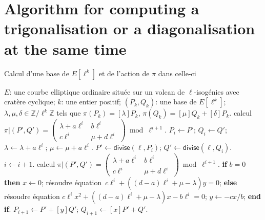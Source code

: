 \documentclass[10pt,a4paper]{book}
\theoremstyle{plain}
\theoremstyle{definition}
\theoremstyle{definition}
\theoremstyle{definition}
\theoremstyle{definition}
\theoremstyle{remark}
\theoremstyle{remark}
\theoremstyle{definition}
\begin{document}
\section{Algorithm for computing a trigonalisation or a diagonalisation at the same time}
\begin{algorithm}
\caption{\label{alg:app:bas:fro}Calcul d'une base de $E[\ell^k]$ et de l'action de $\pi$ dans celle-ci}
\begin{algorithmic}[1]
\REQUIRE $E$: une courbe elliptique ordinaire située sur un volcan de $\ell$-isogénies avec cratère cyclique;
$k$: une entier positif;
\ENSURE $(P_k, Q_k )$: une base de $E[\ell^k]$;
$\lambda, \mu, \delta \in \mathbb{Z}/\ell^k \mathbb{Z}$
tels que $\pi(P_k)= [\lambda] P_k$, $ \pi(Q_k)= [\mu] Q_k + [\delta] P_k$.
\STATE calcul $\pi|(P',Q')=\left( \begin{smallmatrix}
\lambda + a\ell^{i} & b\ell^{i}\\
c\ell^{i} & \mu + d\ell^{i} \end{smallmatrix} \right) \bmod {\ell^{i+1}}.$
\STATE $P_i \leftarrow P'$; $Q_i \leftarrow Q'$; $\lambda \leftarrow \lambda+a \ell^i$; $\mu \leftarrow \mu +a \ell^i$.
\STATE\label{alg:fin:identical:divide}
  $P' \leftarrow \mathsf{divise}(\ell, P_{i})$; $Q' \leftarrow \mathsf{divise} (\ell, Q_{i})$.
\STATE $i \leftarrow i+1$.
\STATE calcul $\pi|(P',Q')=\left( \begin{smallmatrix}
\lambda + a\ell^{i} & b\ell^{i}\\
c\ell^{i} & \mu + d\ell^{i} \end{smallmatrix} \right) \bmod {\ell^{i+1}}.$
\ENDWHILE 
{}
\STATE\label{alg:app:diagonal:solve1}
  \textbf{if} $b = 0$ \textbf{then} $x \leftarrow 0$;
  résoudre équation~$c \ell^{i} + ((d-a) \ell^{i} + \mu-\lambda) y = 0$;
\STATE\label{alg:app:diagonal:solve2}
  \textbf{else} résoudre équation
  $c \ell^{i} x^2 + ((d-a) \ell^{i}+ \mu-\lambda) x - b \ell^{i} = 0$;
  $y \leftarrow -cx/b$; \textbf{end if}.
\STATE\label{alg:app:diagonal:upd-P}
  $P_{i+1} \leftarrow P' + [y] Q'$; $Q_{i+1} \leftarrow [x] P' + Q'$.

\end{algorithmic}
\end{algorithm}
\end{document}
